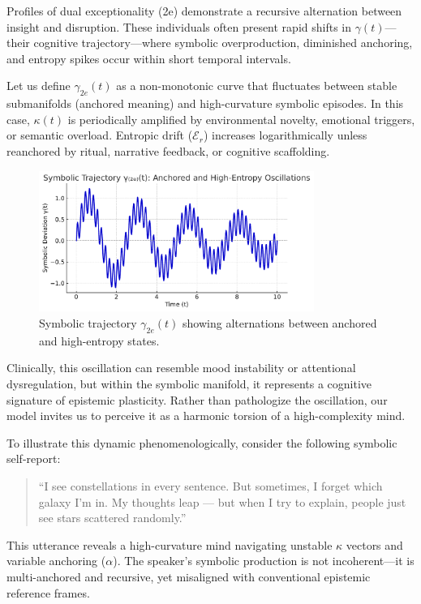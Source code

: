 Profiles of dual exceptionality (2e) demonstrate a recursive alternation between insight and disruption. These individuals often present rapid shifts in $\gamma(t)$—their cognitive trajectory—where symbolic overproduction, diminished anchoring, and entropy spikes occur within short temporal intervals.

Let us define $\gamma_{2e}(t)$ as a non-monotonic curve that fluctuates between stable submanifolds (anchored meaning) and high-curvature symbolic episodes. In this case, $\kappa(t)$ is periodically amplified by environmental novelty, emotional triggers, or semantic overload. Entropic drift ($\mathcal{E}_r$) increases logarithmically unless reanchored by ritual, narrative feedback, or cognitive scaffolding.

\begin{figure}[H]
\centering
\includegraphics[width=0.8\textwidth]{figs/gamma_2e_curve.pdf}
\caption{Symbolic trajectory $\gamma_{2e}(t)$ showing alternations between anchored and high-entropy states.}
\end{figure}

Clinically, this oscillation can resemble mood instability or attentional dysregulation, but within the symbolic manifold, it represents a cognitive signature of epistemic plasticity. Rather than pathologize the oscillation, our model invites us to perceive it as a harmonic torsion of a high-complexity mind.

\bigskip
\noindent
To illustrate this dynamic phenomenologically, consider the following symbolic self-report:

\begin{quote}
“I see constellations in every sentence. But sometimes, I forget which galaxy I’m in. My thoughts leap — but when I try to explain, people just see stars scattered randomly.”
\end{quote}

This utterance reveals a high-curvature mind navigating unstable $\kappa$ vectors and variable anchoring ($\alpha$). The speaker’s symbolic production is not incoherent—it is multi-anchored and recursive, yet misaligned with conventional epistemic reference frames.

